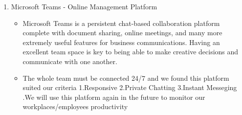 \begin{enumerate}
    \item  Microsoft Teams - Online Management Platform
   \begin{itemize}
     \item Microsoft Teams is a persistent chat-based collaboration platform complete with document sharing, online meetings, and many more extremely useful features for business communications. Having an excellent team space is key to being able to make creative decisions and communicate with one another.


      \item The whole team must be connected 24/7 and we found this platform suited our criteria 1.Responsive 2.Private Chatting 3.Instant Messeging .We will use this platform again in the future to monitor our workplaces/employees productivity
   \end{itemize}


\end{enumerate}


